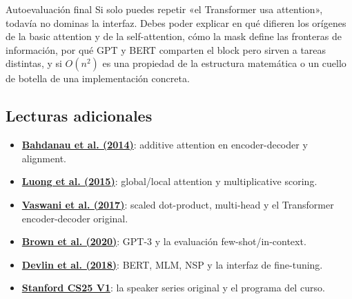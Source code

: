 \begin{warningbox}{Autoevaluación final}
Si solo puedes repetir «el Transformer usa attention», todavía no dominas la interfaz. Debes poder explicar en qué difieren los orígenes de la basic attention y de la self-attention, cómo la mask define las fronteras de información, por qué GPT y BERT comparten el block pero sirven a tareas distintas, y si $O(n^2)$ es una propiedad de la estructura matemática o un cuello de botella de una implementación concreta.
\end{warningbox}

\subsection{Lecturas adicionales}

{\small
\begin{itemize}[nosep,leftmargin=*]
  \item \href{https://arxiv.org/abs/1409.0473}{\textbf{Bahdanau et al. (2014)}}: additive attention en encoder-decoder y alignment.
  \item \href{https://arxiv.org/abs/1508.04025}{\textbf{Luong et al. (2015)}}: global/local attention y multiplicative scoring.
  \item \href{https://arxiv.org/abs/1706.03762}{\textbf{Vaswani et al. (2017)}}: scaled dot-product, multi-head y el Transformer encoder-decoder original.
  \item \href{https://arxiv.org/abs/2005.14165}{\textbf{Brown et al. (2020)}}: GPT-3 y la evaluación few-shot/in-context.
  \item \href{https://arxiv.org/abs/1810.04805}{\textbf{Devlin et al. (2018)}}: BERT, MLM, NSP y la interfaz de fine-tuning.
  \item \href{https://web.stanford.edu/class/cs25/past/cs25-v1/}{\textbf{Stanford CS25 V1}}: la speaker series original y el programa del curso.
\end{itemize}
}


